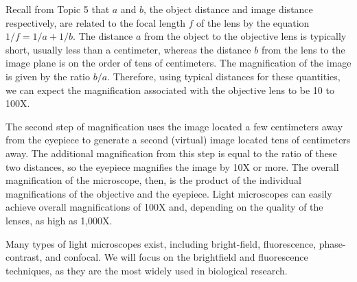 Recall from Topic 5 that $a$ and $b$, the object distance and image distance respectively, are related to the focal length $f$ of the lens by the equation $1/f=1/a+1/b$. The distance $a$ from the object to the objective lens is typically short, usually less than a centimeter, whereas the distance $b$ from the lens to the image plane is on the order of tens of centimeters.  The magnification of the image is given by the ratio $b/a$.  Therefore, using typical distances for these quantities, we can expect the magnification associated with the objective lens to be 10 to 100X.

The second step of magnification uses the image located a few centimeters away from the eyepiece to generate a second (virtual) image located tens of centimeters away.  The additional magnification from this step is equal to the ratio of these two distances, so the eyepiece magnifies the image by 10X or more. The overall magnification of the microscope, then, is the product of the individual magnifications of the objective and the eyepiece.  Light microscopes can easily achieve overall magnifications of 100X and, depending on the quality of the lenses, as high as 1,000X.

Many types of light microscopes exist, including bright-field, fluorescence, phase-contrast, and confocal.  We will focus on the brightfield and fluorescence techniques, as they are the most widely used in biological research.

